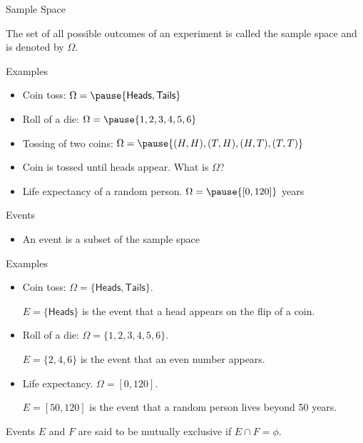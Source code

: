 \documentclass[t]{beamer}
\begin{document}
\begin{frame}{Sample Space}
  \footnotesize
  \begin{definition}[]
    The set of all possible outcomes of an experiment is called the sample space and is denoted by $\Omega$.
  \end{definition}
  \pause
  \begin{block}{Examples}
    \begin{itemize}
      \item \pause Coin toss: $\Omega = \pause \{\mathsf{Heads}, \mathsf{Tails}\}$
      \item \pause Roll of a die: $\Omega = \pause \{1,2,3,4,5,6\}$
      \item \pause Tossing of two coins: $\Omega = \pause \{(H,H), (T,H), (H,T), (T,T)\}$
      \item \pause Coin is tossed until heads appear. What is $\Omega$?
      \item \pause Life expectancy of a random person. $\Omega = \pause {[0, 120]}$ years
    \end{itemize}
  \end{block}
  \normalsize
\end{frame}

\begin{frame}{Events}
  \footnotesize
  \begin{itemize}
    \item An event is a subset of the sample space
  \end{itemize}
  \pause
  \begin{block}{Examples}
    \begin{itemize}
      \item \pause Coin toss: $\Omega = \{\mathsf{Heads}, \mathsf{Tails}\}$. 
      
      \pause $E = \{\mathsf{Heads}\}$ is the event that a head appears on the flip of a coin.
      \item \pause Roll of a die: $\Omega = \{1,2,3,4,5,6\}$. 
      
      \pause $E = \{2,4,6\}$ is the event that an even number appears.
      \item \pause Life expectancy. $\Omega={[0,120]}$. 
      
      \pause $E=[50,120]$ is the event that a random person lives beyond 50 years.
    \end{itemize}
  \end{block}
  \pause
  \begin{definition}
  \pause
  Events $E$ and $F$ are said to be mutually exclusive if $E\cap F = \phi$. 
  \end{definition}
  \normalsize
\end{frame}
\end{document}

